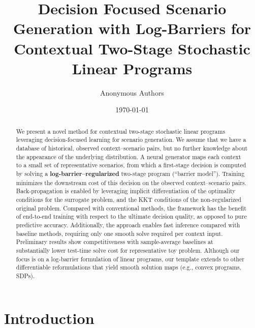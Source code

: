 \documentclass[11pt]{article}
\title{Decision Focused Scenario Generation with Log-Barriers for Contextual Two-Stage Stochastic Linear Programs}
\author{Anonymous Authors}
\date{\today}
\begin{document}
\maketitle

\begin{abstract}
We present a novel method for contextual two-stage stochastic linear programs leveraging decision-focused learning for scenario generation. 
We assume that we have a database of historical, observed context–scenario pairs, but no further knowledge about the appearance of the underlying distribution. 
A neural generator maps each context to a small set of representative scenarios, from which a first-stage decision is computed by solving a \textbf{log-barrier–regularized} two-stage program (“barrier model”). 
Training minimizes the downstream cost of this decision on the observed context–scenario pairs. 
Back-propagation is enabled by leveraging implicit differentiation of the optimality conditions for the surrogate problem, and the KKT conditions of the non-regularized original problem.
Compared with conventional methods, the framework has the benefit of end-to-end training with respect to the ultimate decision quality, as opposed to pure predictive accuracy.
Additionally, the approach enables fast inference compared with baseline methods, requiring only one smooth solve required per context input.
Preliminary results show competitiveness with sample-average baselines at substantially lower test-time solve cost for
representative toy problem. 
Although our focus is on a log-barrier formulation of linear programs, our template extends to other differentiable reformulations that yield smooth solution maps (e.g., convex programs, SDPs).
\end{abstract}


\section{Introduction}

\end{document}
